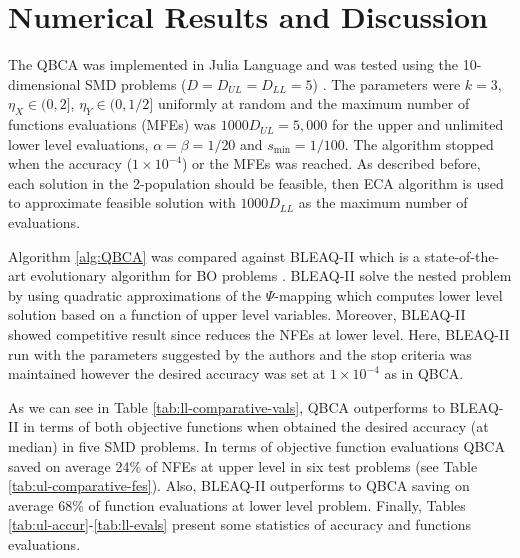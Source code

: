 \documentclass[conference]{IEEEtran}
\theoremstyle{definition}
\begin{document}
\section{Numerical Results and Discussion} %
\label{sec:numerical_result}

The QBCA was implemented in Julia Language \cite{bezanson2017julia} and was tested
using the 10-dimensional SMD problems ($D = D_{UL} = D_{LL} = 5$)
\cite{sinha2014test,sinha2013efficient}. The parameters were $k = 3$,
$\eta_{X} \in (0, 2]$, $\eta_{Y} \in (0, 1/2]$ uniformly at random and the maximum
number of functions evaluations (MFEs) was $1000D_{UL}=5,000$ for the upper and
unlimited lower level evaluations, $\alpha = \beta = 1 / 20$ and $s_{\min} = 1/100$.
The  algorithm stopped when the accuracy ($1\times 10^{-4}$) or the MFEs was reached.
As described before, each solution in the 2-population should be feasible, then
ECA algorithm \cite{Mejia2018} is used to approximate feasible solution with $1000D_{LL}$
as the maximum number of evaluations.

Algorithm \ref{alg:QBCA} was compared against BLEAQ-II which is a state-of-the-art
evolutionary algorithm for BO problems \cite{sinha2018review,sinha2013efficient}.
BLEAQ-II solve the nested problem by using quadratic approximations of the
$\Psi$-mapping which computes lower level solution based on a function of upper
level variables. Moreover, BLEAQ-II showed competitive result since reduces the
NFEs at lower level. Here, BLEAQ-II run with the parameters suggested by the
authors \cite{sinha2018review,sinha2017bilevel} and the stop criteria was maintained
however the desired accuracy was set at $1\times 10^{-4}$ as in QBCA.

As we can see in Table \ref{tab:ll-comparative-vals}, QBCA outperforms to BLEAQ-II
in terms of both objective functions when obtained the desired accuracy (at median)
in five SMD problems. In terms of  objective function evaluations QBCA saved on
average 24\% of NFEs at upper level in six test problems (see Table \ref{tab:ul-comparative-fes}).
Also, BLEAQ-II outperforms to QBCA saving on average 68\% of function evaluations
at lower level problem. Finally, Tables \ref{tab:ul-accur}-\ref{tab:ll-evals} 
present some statistics of accuracy and functions evaluations.
\end{document}
